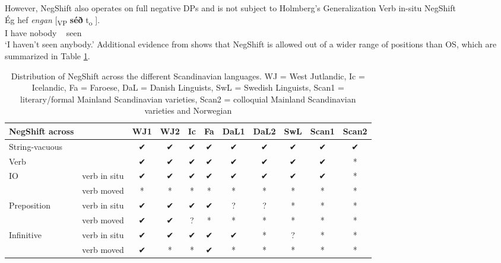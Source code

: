 \documentclass[12pt, letterpaper]{article}
\begin{document}
\ex However, NegShift also operates on full negative DPs and is not subject to Holmberg's Generalization \citep{foxCyclicLinearizationSyntactic2005,engelsScandinavianNegativeIndefinites2012}
		\ea Verb in-situ NegShift\\
		{\gll Ég hef \textit{engan} [\textsubscript{VP} \textbf{séð} t\textsubscript{o}	].\\
			I have nobody ~ seen\\}
		\glt `I haven't seen anybody.'
		\z
\ex Additional evidence from \citet{engelsScandinavianNegativeIndefinites2012} shows that NegShift is allowed out of a wider range of positions than OS, which are summarized in Table \ref{tab:Distribution}.

\begin{table}[!ht]
	\centering
	\caption{Distribution of NegShift across the different Scandinavian languages. WJ = West Jutlandic, Ic = Icelandic, Fa = Faroese, DaL = Danish Linguists, SwL = Swedish Linguists, Scan1 = literary/formal Mainland Scandinavian varieties, Scan2 = colloquial Mainland Scandinavian varieties and Norwegian}
	\label{tab:Distribution}
\begin{tabular}{llccccccccc}
	\hline 
	NegShift across &  & WJ1 & WJ2 & Ic & Fa & DaL1 & DaL2 & SwL & Scan1 & Scan2 \\ 
	\hline 
	String-vacuous &  & ✔︎ & ✔︎ & ✔︎ & ✔︎ & ✔︎ & ✔︎ & ✔︎ & ✔︎ & ✔︎ \\ 
	Verb &  & ✔︎ & ✔︎ & ✔︎ & ✔︎ & ✔︎ & ✔︎ & ✔︎ & ✔︎ & * \\ 
	IO & verb in situ & ✔︎ & ✔︎ & ✔︎ & ✔︎ & ✔︎ & ✔︎ & ✔︎ & ✔︎ & * \\ 
	& verb moved & * & * & * & * & * & * & * & * & * \\ 
	Preposition & verb in situ & ✔︎ & ✔︎ & ✔︎ & ✔︎ & ? & ? & * & * & * \\ 
	& verb moved & ✔︎ & ✔︎ & ? & * & * & * & * & * & * \\ 
	Infinitive & verb in situ & ✔︎ & ✔︎ & ✔︎ & ✔︎ & ✔︎ & * & ? & * & * \\ 
	& verb moved & ✔︎ & * & * & ✔︎ & * & * & * & * & * \\ 
	\hline 
\end{tabular} 
\end{table}
\z
\end{document}
